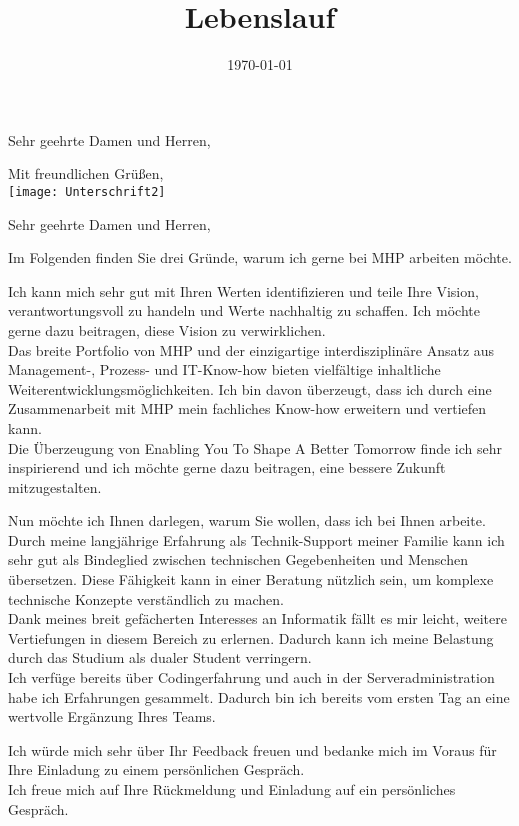 \documentclass[11pt,a4paper,sans]{moderncv}        %
\title{Lebenslauf}                               %
\begin{document}
\date{\today}
\subject{Bewerbung auf ein Duales Studium der Wirtschaftsinformatik}
\opening{Sehr geehrte Damen und Herren,}
\closing{Mit freundlichen Grüßen, \\ \texttt{[image: Unterschrift2]}}
\makelettertitle
Sehr geehrte Damen und Herren,

 Im Folgenden finden Sie drei Gründe, warum ich gerne bei MHP arbeiten möchte.

 Ich kann mich sehr gut mit Ihren Werten identifizieren und teile Ihre Vision, verantwortungsvoll zu handeln und Werte nachhaltig zu schaffen. Ich möchte gerne dazu beitragen, diese Vision zu verwirklichen.\\
Das breite Portfolio von MHP und der einzigartige interdisziplinäre Ansatz aus Management-, Prozess- und IT-Know-how bieten vielfältige inhaltliche Weiterentwicklungsmöglichkeiten. Ich bin davon überzeugt, dass ich durch eine Zusammenarbeit mit MHP mein fachliches Know-how erweitern und vertiefen kann.\\
Die Überzeugung von \glqq Enabling You To Shape A Better Tomorrow\grqq{} finde ich sehr inspirierend und ich möchte gerne dazu beitragen, eine bessere Zukunft mitzugestalten.

Nun möchte ich Ihnen darlegen, warum Sie wollen, dass ich bei Ihnen arbeite.\\
Durch meine langjährige Erfahrung als Technik-Support meiner Familie kann ich sehr gut als Bindeglied zwischen technischen Gegebenheiten und Menschen übersetzen. Diese Fähigkeit kann in einer Beratung nützlich sein, um komplexe technische Konzepte verständlich zu machen.\\
Dank meines breit gefächerten Interesses an Informatik fällt es mir leicht, weitere Vertiefungen in diesem Bereich zu erlernen. Dadurch kann ich meine Belastung durch das Studium als dualer Student verringern.\\
Ich verfüge bereits über Codingerfahrung und auch in der Serveradministration habe ich Erfahrungen gesammelt. Dadurch bin ich bereits vom ersten Tag an eine wertvolle Ergänzung Ihres Teams.

Ich würde mich sehr über Ihr Feedback freuen und bedanke mich im Voraus für Ihre Einladung zu einem persönlichen Gespräch.\\
Ich freue mich auf Ihre Rückmeldung und Einladung auf ein persönliches Gespräch.
\end{document}
